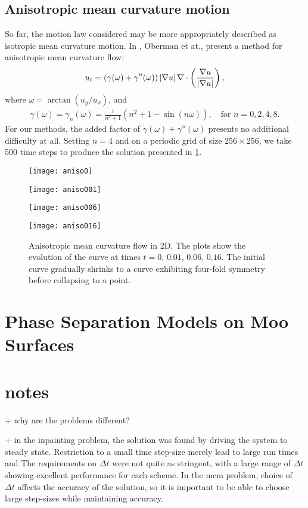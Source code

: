 \subsection{Anisotropic mean curvature motion}
So far, the motion law considered may be more appropriately described as isotropic mean curvature motion. In \cite{oberman2011aniso}, Oberman et at., present a method for anisotropic mean curvature flow: 
\begin{align}
        u_t = (\gamma(\omega) + \gamma''(\omega))\left|\nabla u\right| \nabla \cdot \left( \frac{\nabla u}{\left|\nabla u\right|} \right),
\end{align}
where $\omega = \arctan(u_y/u_x)$, and 
\begin{align}
        \gamma(\omega) 
= \gamma_n(\omega) 
= \frac{1}{n^2+1}(n^2 + 1 - \sin(n\omega)), 
\quad\text{for } n = 0,2,4,8.
\end{align}
For our methods, the added factor of $\gamma(\omega) + \gamma''(\omega)$ presents no additional difficulty at all. Setting $n=4$ and on a periodic grid of size $256\times 256$, we take 500 time steps to produce the solution presented in \cref{fig:aniso mcm}. 
\begin{figure}
        \centering
\begin{minipage}{0.44\textwidth}
       \texttt{[image: aniso0]}
\end{minipage}
\begin{minipage}{0.44\textwidth}
       \texttt{[image: aniso001]}
\end{minipage}
\begin{minipage}{0.44\textwidth}
       \texttt{[image: aniso006]}
\end{minipage}
\begin{minipage}{0.44\textwidth}
       \texttt{[image: aniso016]}
\end{minipage}
\caption[Anisotropic mean curvature flow.]{Anisotropic mean curvature flow in 2D. The plots show the evolution of the curve at times $t=0$, $0.01$, $0.06$, $0.16$. The initial curve gradually shrinks to a curve exhibiting four-fold symmetry before collapsing to a point.}
\label{fig:aniso mcm}
\end{figure}

\section{Phase Separation Models on Moo Surfaces}

\section{notes}
+ why are the problems different?

+ in the inpainting problem, the solution was found by driving the system to steady state. Restriction to a small time step-size merely lead to large run times and  The requirements on $\Delta t$ were not quite as stringent, with a large range of $\Delta t$ showing excellent performance for each scheme. In the mcm problem, choice of $\Delta t$ affects the accuracy of the solution, so it is important to be able to choose large step-sizes while maintaining accuracy.
